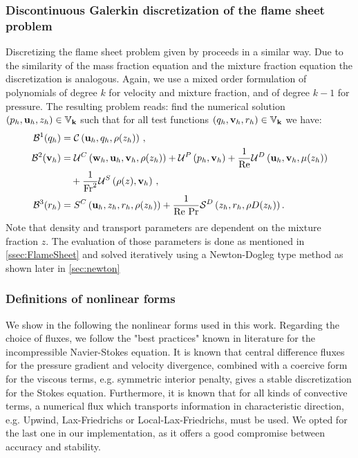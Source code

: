 \subsubsection{Discontinuous Galerkin discretization of the flame sheet problem}
Discretizing the flame sheet problem given by  proceeds in a similar way. Due to the similarity of the mass fraction equation and the mixture fraction equation the discretization is analogous. Again, we use a mixed order formulation of polynomials of degree $k$ for velocity and mixture fraction, and of degree $k-1$ for pressure. The resulting problem reads: find the numerical solution $(p_h,\textbf{u}_h,z_h)\in \mathbb{V}_{\textbf{k}}$ such that for all test functions $(q_h,\textbf{v}_h,r_h)\in \mathbb{V}_{\textbf{k}}$ we have:
\begin{subequations}
	\begin{align}
		\mathcal{B}^1(q_h)
		 & = 	\mathcal{C}\left(\textbf{u}_h,q_h, \rho(z_h)\right) \,, \label{DiscretizedConti2}                                                                                                                \\
		\mathcal{B}^2(\textbf{v}_h)
		 & = 	\mathcal{U}^C\left(\textbf{w}_h,\textbf{u}_h,\textbf{v}_h, \rho(z_h)\right)+ 	\mathcal{U}^P\left(p_h,\textbf{v}_h\right) +\frac{1}{\text{Re}}\mathcal{U}^D\left(\textbf{u}_h,\textbf{v}_h,\mu(z_h)\right)\notag \\
		 & \quad  + \frac{1}{\text{Fr}^2}\mathcal{U}^S\left(\rho(z), \textbf{v}_h\right)\,, \label{DiscretizedMomentum2}                                                                                         \\
		\mathcal{B}^3(r_h)
		 & = {S}^C\left(\textbf{u}_h,z_h,r_h, \rho(z_h)\right) + \frac{1}{\text{Re}~\text{Pr}}\mathcal{S}^D\left(z_h,r_h,\rho D(z_h)\right). \label{DiscretizedEnergy2}
	\end{align}\label{eqs:variatFS}
\end{subequations}
Note that density and transport parameters are dependent on the mixture fraction $z$. The evaluation of those parameters is done as mentioned in  \cref{ssec:FlameSheet} and solved iteratively using a Newton-Dogleg type method as shown later in \cref{sec:newton}
\subsubsection{Definitions of nonlinear forms}
We show in the following the nonlinear forms used in this work. Regarding the choice of fluxes, we follow the "best practices" known in literature for the incompressible Navier-Stokes equation.
It is known \cite{pietroMathematicalAspectsDiscontinuous2012,giraultDiscontinuousGalerkinMethod2004} that central difference fluxes for the pressure gradient and velocity divergence, combined with a coercive form for the viscous terms, e.g. symmetric interior penalty, gives a stable discretization for the Stokes equation. Furthermore, it is known that for all kinds of convective terms, a numerical flux which transports information in characteristic direction, e.g. Upwind, Lax-Friedrichs or Local-Lax-Friedrichs, must be used. We opted for the last one in our implementation, as it offers a good compromise between accuracy and stability.
